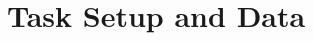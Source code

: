 \documentclass[11pt,a4paper]{article}
\begin{document}




\clearpage

\section{Task Setup and Data}
\end{document}
